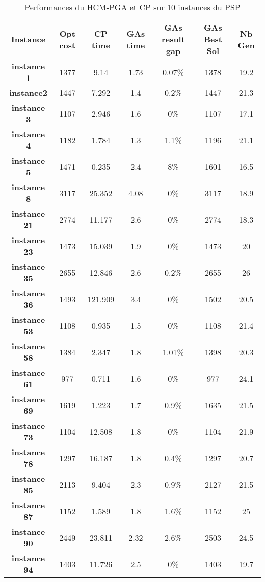 		\begin{table}[h]
		\centering
		\begin{tabular}{|c|c|c|c|c|c|c|}
			\hline
			\textbf{Instance} & \textbf{Opt cost} & \textbf{CP time} & \textbf{GAs time} & \textbf{GAs result gap} & \textbf{GAs Best Sol} & \textbf{Nb Gen}\\
			\hline
			\textbf{instance 1} & 1377 & 9.14 & 1.73 & 0.07\% & 1378 & 19.2 \\
			\textbf{instance2} & 1447 & 7.292 & 1.4 & 0.2\% & 1447 & 21.3\\
			\textbf{instance 3} & 1107 & 2.946 & 1.6 & 0\% & 1107 & 17.1\\
			\textbf{instance 4} & 1182 & 1.784 & 1.3 & 1.1\% & 1196 & 21.1\\
			\textbf{instance 5} & 1471 & 0.235 & 2.4 & 8\% & 1601 & 16.5\\
			\textbf{instance 8} & 3117 & 25.352 & 4.08 & 0\% & 3117 & 18.9\\
			\textbf{instance 21} & 2774 & 11.177 & 2.6 & 0\% & 2774 & 18.3\\
			\textbf{instance 23} & 1473 & 15.039 & 1.9 & 0\% & 1473 & 20\\
			\textbf{instance 35} & 2655 & 12.846 & 2.6 & 0.2\% & 2655 & 26\\
			\textbf{instance 36} & 1493 & 121.909 & 3.4 & 0\% & 1502 & 20.5\\
			\textbf{instance 53} & 1108 & 0.935 & 1.5 & 0\% & 1108 & 21.4\\
			\textbf{instance 58} & 1384 & 2.347 & 1.8 & 1.01\% & 1398 & 20.3\\
			\textbf{instance 61} & 977 & 0.711 & 1.6 & 0\% & 977 & 24.1\\
			\textbf{instance 69} & 1619 & 1.223 & 1.7 & 0.9\% & 1635 & 21.5\\
			\textbf{instance 73} & 1104 & 12.508 & 1.8 & 0\% & 1104 & 21.9\\
			\textbf{instance 78} & 1297 & 16.187 & 1.8 & 0.4\% & 1297 & 20.7\\
			\textbf{instance 85} & 2113 & 9.404 & 2.3 & 0.9\% & 2127 & 21.5\\
			\textbf{instance 87} & 1152 & 1.589 & 1.8 & 1.6\% & 1152 & 25\\
			\textbf{instance 90} & 2449 & 23.811 & 2.32 & 2.6\% & 2503 & 24.5\\
			\textbf{instance 94} & 1403 & 11.726 & 2.5 & 0\% & 1403 & 19.7\\
			\hline
		\end{tabular}	
		\caption{Performances du HCM-PGA et CP sur 10 instances du PSP}	
		\label{tab:hcm_pga_cp}	
	\end{table}	
	
